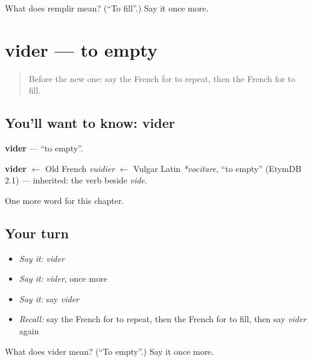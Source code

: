 \begin{tcolorbox}[breakable,colback=teal!4,colframe=teal!35!black,title={Before you move on}]
What does remplir mean? (\textquotedblleft{}To fill\textquotedblright{}.) Say it once more.
\end{tcolorbox}
\section[vider]{vider — to empty}

\label{lesson:FR-C234-vider}



\begin{quote}
Before the new one: say the French for to repeat, then the French for to fill.
\end{quote}

\subsection*{You'll want to know: vider}
\textbf{vider} — \textquotedblleft{}to empty\textquotedblright{}.

\begin{cousinweb}
\textbf{vider} $\leftarrow$ Old French \emph{vuidier} $\leftarrow$ Vulgar Latin \emph{*vocitare}, \textquotedblleft{}to empty\textquotedblright{} (EtymDB 2.1) — inherited: the verb beside \emph{vide}.
\end{cousinweb}

\begin{grammarlens}[title={What you've built}]
One more word for this chapter.
\end{grammarlens}

\subsection*{Your turn}
\begin{itemize}
\raggedright
  \item \emph{Say it:} \emph{vider}
  \item \emph{Say it:} \emph{vider}, once more
  \item \emph{Say it:} say \emph{vider}
  \item \emph{Recall:} say the French for to repeat, then the French for to fill, then say \emph{vider} again
\end{itemize}

\begin{tcolorbox}[breakable,colback=teal!4,colframe=teal!35!black,title={Before you move on}]
What does vider mean? (\textquotedblleft{}To empty\textquotedblright{}.) Say it once more.
\end{tcolorbox}
